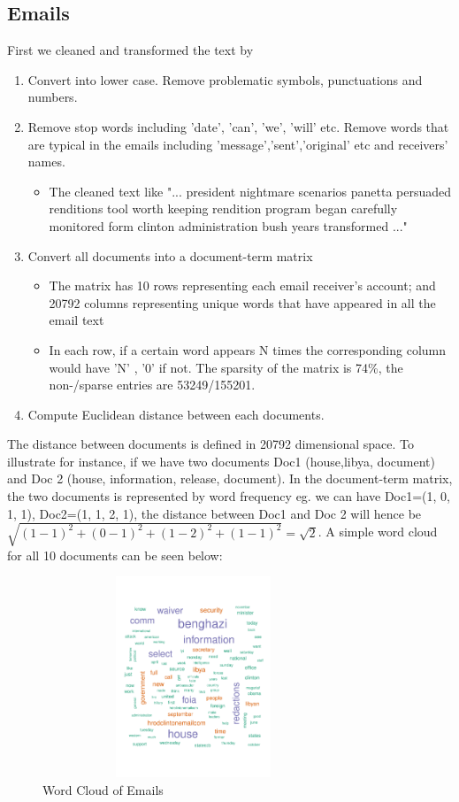 \documentclass[11pt,a4paper]{article}
\begin{document}
\newpage
\subsection*{Emails} 
First we cleaned and transformed the text by 
\begin{enumerate}
\item Convert into lower case. Remove problematic symbols, punctuations and numbers.
\item Remove stop words including 'date', 'can', 'we', 'will' etc. Remove words that are typical in the emails including 'message','sent','original' etc and receivers' names.
\begin{itemize}
\item The cleaned text like "... president nightmare scenarios panetta persuaded renditions tool worth keeping rendition program began carefully monitored form clinton administration bush years transformed ..."
\end{itemize}
\item Convert all documents into a document-term matrix
\begin{itemize} 
\item The matrix has 10 rows representing each email receiver's account; and 20792 columns representing unique words that have appeared in all the email text
\item In each row, if a certain word appears N times the corresponding column would have 'N' , '0' if not. The sparsity of the matrix is 74\%, the non-/sparse entries are 53249/155201. 
\end{itemize}
\item Compute Euclidean distance between each documents.
\end{enumerate}
The distance between documents is defined in 20792 dimensional space. To illustrate for instance, if we have two documents Doc1 (house,libya, document) and Doc 2 (house, information, release, document). In the document-term matrix, the two documents is represented by word frequency eg. we can have Doc1=(1, 0, 1, 1), Doc2=(1, 1, 2, 1), the distance between Doc1 and Doc 2 will hence be $\sqrt{(1-1)^{2} + (0-1)^{2} + (1-2)^{2} + (1-1)^{2}} = \sqrt{2}$.
A simple word cloud for all 10 documents can be seen below:
\begin{figure}[h!]
    \centering
    \includegraphics[width=9cm,height=6cm]
    {wcloud.pdf}
    \caption{Word Cloud of Emails}
\end{figure}
\end{document}
